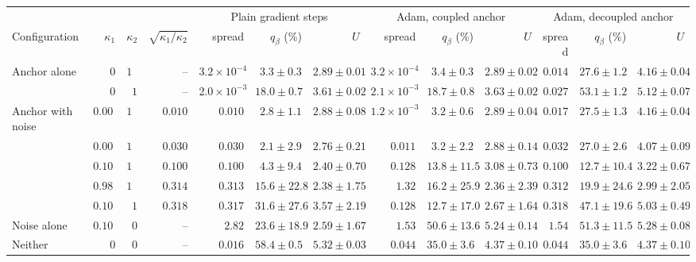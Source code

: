 \setlength{\tabcolsep}{3pt}\begin{tabular}{lrrrrrrrrrrrr}
\toprule
 & & & & \multicolumn{3}{c}{Plain gradient steps} & \multicolumn{3}{c}{Adam, coupled anchor} & \multicolumn{3}{c}{Adam, decoupled anchor} \\
\cmidrule(lr){5-7}\cmidrule(lr){8-10}\cmidrule(lr){11-13}
Configuration & $\kappa_1$ & $\kappa_2$ & $\sqrt{\kappa_1/\kappa_2}$ & spread & $q_\beta$ (\%) & $U$ & spread & $q_\beta$ (\%) & $U$ & spread & $q_\beta$ (\%) & $U$ \\
\midrule
Anchor alone & $0$ & $10$ & -- & $3.2\times10^{-4}$ & $3.3\pm0.3$ & $2.89\pm0.01$ & $3.2\times10^{-4}$ & $3.4\pm0.3$ & $2.89\pm0.02$ & $0.014$ & $27.6\pm1.2$ & $4.16\pm0.04$ \\
 & $0$ & $1$ & -- & $2.0\times10^{-3}$ & $18.0\pm0.7$ & $3.61\pm0.02$ & $2.1\times10^{-3}$ & $18.7\pm0.8$ & $3.63\pm0.02$ & $0.027$ & $53.1\pm1.2$ & $5.12\pm0.07$ \\
Anchor with noise & $0.001$ & $10$ & $0.010$ & $0.010$ & $2.8\pm1.1$ & $2.88\pm0.08$ & $1.2\times10^{-3}$ & $3.2\pm0.6$ & $2.89\pm0.04$ & $0.017$ & $27.5\pm1.3$ & $4.16\pm0.04$ \\
 & $0.009$ & $10$ & $0.030$ & $0.030$ & $2.1\pm2.9$ & $2.76\pm0.21$ & $0.011$ & $3.2\pm2.2$ & $2.88\pm0.14$ & $0.032$ & $27.0\pm2.6$ & $4.07\pm0.09$ \\
 & $0.101$ & $10$ & $0.100$ & $0.100$ & $4.3\pm9.4$ & $2.40\pm0.70$ & $0.128$ & $13.8\pm11.5$ & $3.08\pm0.73$ & $0.100$ & $12.7\pm10.4$ & $3.22\pm0.67$ \\
 & $0.989$ & $10$ & $0.314$ & $0.313$ & $15.6\pm22.8$ & $2.38\pm1.75$ & $1.32$ & $16.2\pm25.9$ & $2.36\pm2.39$ & $0.312$ & $19.9\pm24.6$ & $2.99\pm2.05$ \\
 & $0.101$ & $1$ & $0.318$ & $0.317$ & $31.6\pm27.6$ & $3.57\pm2.19$ & $0.128$ & $12.7\pm17.0$ & $2.67\pm1.64$ & $0.318$ & $47.1\pm19.6$ & $5.03\pm0.49$ \\
Noise alone & $0.101$ & $0$ & -- & $2.82$ & $23.6\pm18.9$ & $2.59\pm1.67$ & $1.53$ & $50.6\pm13.6$ & $5.24\pm0.14$ & $1.54$ & $51.3\pm11.5$ & $5.28\pm0.08$ \\
Neither & $0$ & $0$ & -- & $0.016$ & $58.4\pm0.5$ & $5.32\pm0.03$ & $0.044$ & $35.0\pm3.6$ & $4.37\pm0.10$ & $0.044$ & $35.0\pm3.6$ & $4.37\pm0.10$ \\
\bottomrule
\end{tabular}
